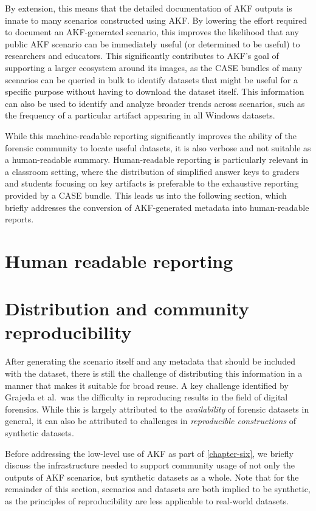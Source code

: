\documentclass[letterpaper,12pt]{report}
\begin{document}
By extension, this means that the detailed documentation of AKF outputs
is innate to many scenarios constructed using AKF. By lowering the
effort required to document an AKF-generated scenario, this improves the
likelihood that any public AKF scenario can be immediately useful (or
determined to be useful) to researchers and educators. This
significantly contributes to AKF's goal of supporting a larger ecosystem
around its images, as the CASE bundles of many scenarios can be queried
in bulk to identify datasets that might be useful for a specific purpose
without having to download the dataset itself. This information can also
be used to identify and analyze broader trends across scenarios, such as
the frequency of a particular artifact appearing in all Windows
datasets.

While this machine-readable reporting significantly improves the ability
of the forensic community to locate useful datasets, it is also verbose
and not suitable as a human-readable summary. Human-readable reporting
is particularly relevant in a classroom setting, where the distribution
of simplified answer keys to graders and students focusing on key
artifacts is preferable to the exhaustive reporting provided by a CASE
bundle. This leads us into the following section, which briefly
addresses the conversion of AKF-generated metadata into human-readable
reports.

\section{Human readable reporting}\label{human-readable-reporting}

\section{Distribution and community
reproducibility}\label{distribution-and-community-reproducibility}

After generating the scenario itself and any metadata that should be
included with the dataset, there is still the challenge of distributing
this information in a manner that makes it suitable for broad reuse. A
key challenge identified by Grajeda et al.~was the difficulty in
reproducing results in the field of digital forensics. While this is
largely attributed to the \emph{availability} of forensic datasets in
general, it can also be attributed to challenges in \emph{reproducible
constructions} of synthetic datasets.

Before addressing the low-level use of AKF as part of \autoref{chapter-six}, we briefly discuss the infrastructure needed to
support community usage of not only the outputs of AKF scenarios, but
synthetic datasets as a whole. Note that for the remainder of this
section, scenarios and datasets are both implied to be synthetic, as the
principles of reproducibility are less applicable to real-world
datasets.
\end{document}
